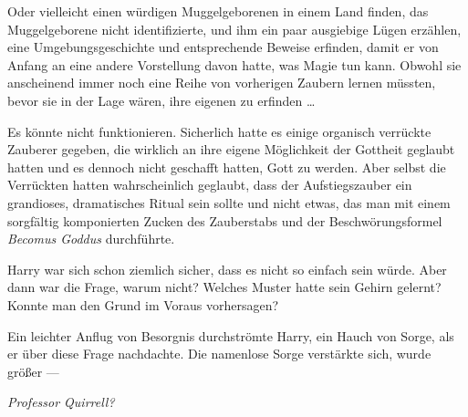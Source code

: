 Oder vielleicht einen würdigen Muggelgeborenen in einem Land finden, das Muggelgeborene nicht identifizierte, und ihm ein paar ausgiebige Lügen erzählen, eine Umgebungsgeschichte und entsprechende Beweise erfinden, damit er von Anfang an eine andere Vorstellung davon hatte, was Magie tun kann. Obwohl sie anscheinend immer noch eine Reihe von vorherigen Zaubern lernen müssten, bevor sie in der Lage wären, ihre eigenen zu erfinden …

Es könnte nicht funktionieren. Sicherlich hatte es einige organisch verrückte Zauberer gegeben, die wirklich an ihre eigene Möglichkeit der Gottheit geglaubt hatten und es dennoch nicht geschafft hatten, Gott zu werden. Aber selbst die Verrückten hatten wahrscheinlich geglaubt, dass der Aufstiegszauber ein grandioses, dramatisches Ritual sein sollte und nicht etwas, das man mit einem sorgfältig komponierten Zucken des Zauberstabs und der Beschwörungsformel \emph{Becomus Goddus} durchführte.

Harry war sich schon ziemlich sicher, dass es nicht so einfach sein würde. Aber dann war die Frage, warum nicht? Welches Muster hatte sein Gehirn gelernt? Konnte man den Grund im Voraus vorhersagen?

Ein leichter Anflug von Besorgnis durchströmte Harry, ein Hauch von Sorge, als er über diese Frage nachdachte. Die namenlose Sorge verstärkte sich, wurde größer —

\emph{Professor Quirrell?}

